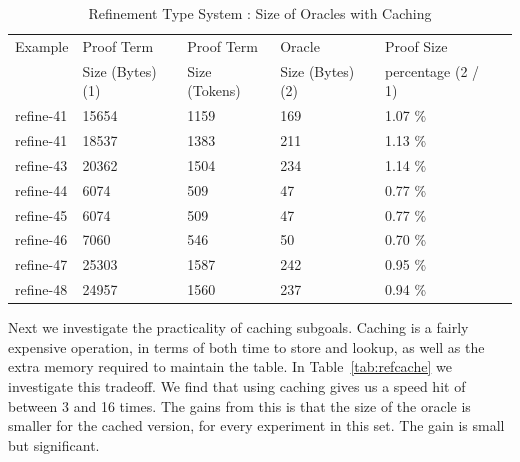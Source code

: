 \documentclass{acmconf}
\begin{document}
\begin{table}[htbp]
\begin{center}
\begin{small}
\begin{tabular}{|l|l|l|l|l|l|}
\hline
Example & Proof Term & Proof Term & Oracle & Proof Size\\
& Size (Bytes) (1) & Size (Tokens) & Size (Bytes) (2) & percentage (2 / 1)\\
\hline
refine-41 & 15654 & 1159 & 169 & 1.07 \%\\
refine-41 & 18537 & 1383 & 211 & 1.13 \%\\
refine-43 & 20362 & 1504 & 234 & 1.14 \%\\
refine-44 & 6074 & 509 & 47 & 0.77 \%\\
refine-45 & 6074 & 509 & 47 & 0.77 \%\\
refine-46 & 7060 & 546 & 50 & 0.70 \%\\
refine-47 & 25303 & 1587 & 242 & 0.95 \%\\
refine-48 & 24957 & 1560 & 237 & 0.94 \%\\
\hline
\end{tabular}
\end{small}
\end{center}
\caption{\label{tab:refsizes} Refinement Type System : 
Size of Oracles with Caching}
\end{table}

Next we investigate the practicality of caching subgoals. Caching is 
a fairly expensive operation, in terms of both time to store and lookup, 
as well as the extra memory required to maintain the table. In 
Table~\ref{tab:refcache} we investigate this tradeoff. We find that
using caching gives us a speed hit of between 3 and 16 times. The 
gains from this is that the size of the oracle is smaller for the
cached version, for every experiment in this set. The gain is small
but significant.
\end{document}

